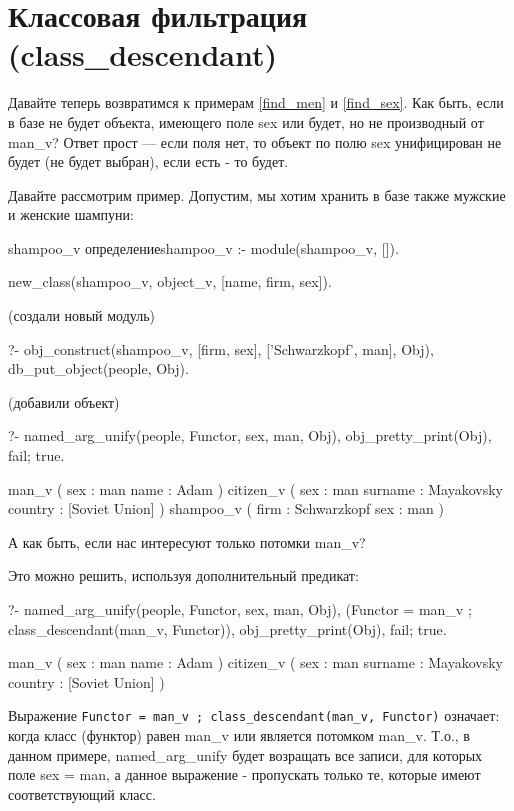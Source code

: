 \documentclass[a4paper]{book}
\begin{document}
\section{Классовая фильтрация (class\_descendant)}
\label{class_descendant}

Давайте теперь возвратимся к примерам \ref{find_men} и
\ref{find_sex}. Как быть, если в базе не будет объекта, имеющего
поле sex или будет, но не производный от man\_v? Ответ прост ---
если поля нет, то объект по полю sex унифицирован не будет (не
будет выбран), если есть - то будет.

Давайте рассмотрим пример. Допустим, мы хотим хранить в базе
также мужские и женские шампуни:

\begin{example}{shampoo\_v определение}{shampoo_v}
:- module(shampoo_v, []).

new_class(shampoo_v, object_v, [name, firm, sex]).
\end{example}

(создали новый модуль)

\begin{example}{}{}
?- obj_construct(shampoo_v, [firm, sex], 
                 ['Schwarzkopf', man], Obj),
    db_put_object(people, Obj).
\end{example}

(добавили объект)

\begin{example}{}{}
?- named_arg_unify(people, Functor, sex, man, Obj), 
   obj_pretty_print(Obj), fail; true.

man_v ( 
  sex : man 
  name : Adam 
) 
citizen_v ( 
  sex : man 
  surname : Mayakovsky 
  country : [Soviet Union] 
) 
shampoo_v ( 
  firm : Schwarzkopf 
  sex : man 
) 
\end{example}

А как быть, если нас интересуют только потомки man\_v?

Это можно решить, используя дополнительный предикат:

\begin{example}{}{}
?- named_arg_unify(people, Functor, sex, man, Obj), 
   (Functor = man_v ; class_descendant(man_v, Functor)), 
   obj_pretty_print(Obj), fail; true.

man_v ( 
  sex : man 
  name : Adam 
) 
citizen_v ( 
  sex : man 
  surname : Mayakovsky 
  country : [Soviet Union] 
) 
\end{example}

Выражение
\verb|Functor = man_v ; class_descendant(man_v, Functor)|
означает: когда класс (функтор) равен man\_v или является
потомком man\_v. Т.о., в данном примере, named\_arg\_unify будет
возращать все записи, для которых поле sex = man, а данное
выражение - пропускать только те, которые имеют соответствующий
класс. 
\end{document}
